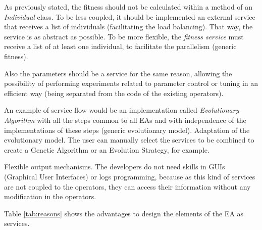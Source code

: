 As previously stated, %
 the 
fitness should not be calculated within a method of an {\em Individual} class. To be less
coupled, it should be implemented an external service that receives a list of individuals (facilitating the load balancing). That way, the service is as abstract as possible.
To be more flexible, the
  {\em fitness service} must receive a list of at least one
  individual, to facilitate the parallelism (generic fitness). %

Also the parameters should be
a service for the same reason, allowing the possibility of performing
experiments related to  parameter control or tuning \cite{ParameterControlEiben07} in an efficient way
(being separated from the code of the existing operators).

An example of service flow would be an implementation called {\em Evolutionary Algorithm} with all the steps common to all EAs and with independence of the implementations of these steps (generic evolutionary model). Adaptation of the evolutionary model. The user can manually
  select the services to be combined to create a Genetic Algorithm or
  an Evolution Strategy, for example.

Flexible output mechanisms. The developers do not need skills in
  GUIs (Graphical User Interfaces) or logs programming, because as
  this kind of services are not coupled to the operators, they can
  access their information without any modification in the
  operators.


Table \ref{tab:reasons} shows the advantages to design the elements of the EA as services.

